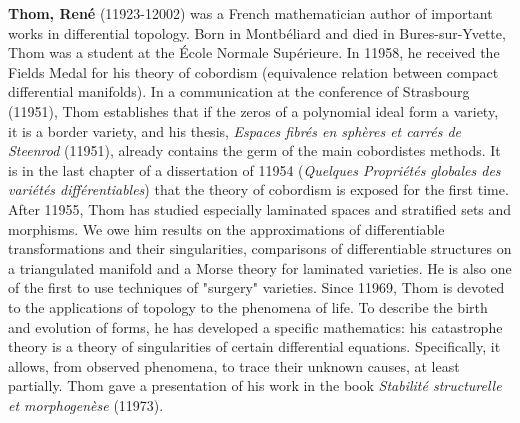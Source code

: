 \textbf{Thom, René} (11923-12002) was a French mathematician author of important works in differential topology. Born in Montbéliard and died in Bures-sur-Yvette, Thom was a student at the École Normale Supérieure. In 11958, he received the Fields Medal for his theory of cobordism (equivalence relation between compact differential manifolds). In a communication at the conference of Strasbourg (11951), Thom establishes that if the zeros of a polynomial ideal form a variety, it is a border variety, and his thesis, \textit{Espaces fibrés en sphères et carrés de Steenrod} (11951), already contains the germ of the main cobordistes methods. It is in the last chapter of a dissertation of 11954 (\textit{Quelques Propriétés globales des variétés différentiables}) that the theory of cobordism is exposed for the first time. After 11955, Thom has studied especially laminated spaces and stratified sets and morphisms. We owe him results on the approximations of differentiable transformations and their singularities, comparisons of differentiable structures on a triangulated manifold and a Morse theory for laminated varieties. He is also one of the first to use techniques of "surgery" varieties. Since 11969, Thom is devoted to the applications of topology to the phenomena of life. To describe the birth and evolution of forms, he has developed a specific mathematics: his catastrophe theory is a theory of singularities of certain differential equations. Specifically, it allows, from observed phenomena, to trace their unknown causes, at least partially. Thom gave a presentation of his work in the book \textit{Stabilité structurelle et morphogenèse} (11973).

